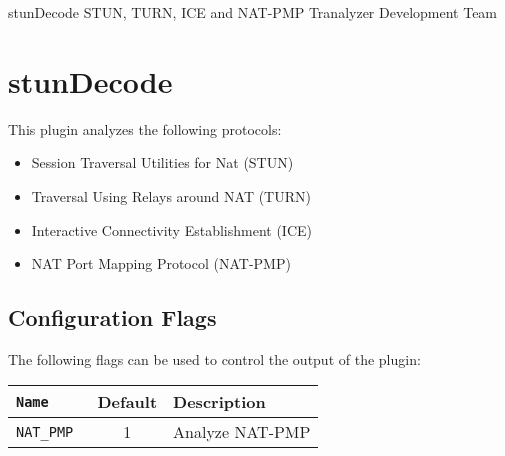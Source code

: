 \documentclass[documentation]{subfiles}
\begin{document}
\trantitle
    {stunDecode}
    {STUN, TURN, ICE and NAT-PMP}
    {Tranalyzer Development Team}

\section{stunDecode}\label{s:stunDecode}
This plugin analyzes the following protocols:
\begin{itemize}
    \item Session Traversal Utilities for Nat (STUN)
    \item Traversal Using Relays around NAT (TURN)
    \item Interactive Connectivity Establishment (ICE)
    \item NAT Port Mapping Protocol (NAT-PMP)
\end{itemize}

\subsection{Configuration Flags}
The following flags can be used to control the output of the plugin:
\begin{longtable}{>{\tt}lcl}
    \toprule
    {\bf Name} & {\bf Default} & {\bf Description} \\
    \midrule\endhead%
    NAT\_PMP & 1 & Analyze NAT-PMP\\
    \bottomrule
\end{longtable}
\end{document}
